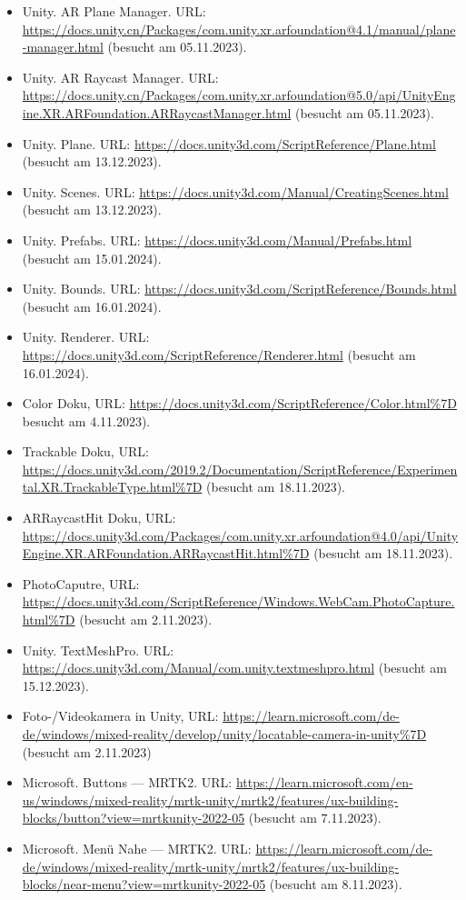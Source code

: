 \begin{itemize}
    \item Unity. AR Plane Manager. URL: \url{https://docs.unity.cn/Packages/com.unity.xr.arfoundation@4.1/manual/plane-manager.html} (besucht am 05.11.2023).
    \item Unity. AR Raycast Manager. URL: \url{https://docs.unity.cn/Packages/com.unity.xr.arfoundation@5.0/api/UnityEngine.XR.ARFoundation.ARRaycastManager.html} (besucht am 05.11.2023).
    \item Unity. Plane. URL: \url{https://docs.unity3d.com/ScriptReference/Plane.html} (besucht am 13.12.2023).
    \item Unity. Scenes. URL: \url{https://docs.unity3d.com/Manual/CreatingScenes.html} (besucht am 13.12.2023).
    \item Unity. Prefabs. URL: \url{https://docs.unity3d.com/Manual/Prefabs.html} (besucht am 15.01.2024).
    \item Unity. Bounds. URL: \url{https://docs.unity3d.com/ScriptReference/Bounds.html} (besucht am 16.01.2024).
    \item Unity. Renderer. URL: \url{https://docs.unity3d.com/ScriptReference/Renderer.html} (besucht am 16.01.2024).
    \item Color Doku, URL:  \url{https://docs.unity3d.com/ScriptReference/Color.html%7D} besucht am 4.11.2023).
    \item Trackable Doku, URL:  \url{https://docs.unity3d.com/2019.2/Documentation/ScriptReference/Experimental.XR.TrackableType.html%7D} (besucht am 18.11.2023).
    \item ARRaycastHit Doku, URL:  \url{https://docs.unity3d.com/Packages/com.unity.xr.arfoundation@4.0/api/UnityEngine.XR.ARFoundation.ARRaycastHit.html%7D} (besucht am 18.11.2023).
    \item PhotoCaputre, URL:  \url{https://docs.unity3d.com/ScriptReference/Windows.WebCam.PhotoCapture.html%7D} (besucht am 2.11.2023).
    \item Unity. TextMeshPro. URL: \url{https://docs.unity3d.com/Manual/com.unity.textmeshpro.html} (besucht am 15.12.2023).
    \item Foto-/Videokamera in Unity, URL:  \url{https://learn.microsoft.com/de-de/windows/mixed-reality/develop/unity/locatable-camera-in-unity%7D} (besucht am 2.11.2023)
    \item Microsoft. Buttons — MRTK2. URL: \url{https://learn.microsoft.com/en-us/windows/mixed-reality/mrtk-unity/mrtk2/features/ux-building-blocks/button?view=mrtkunity-2022-05} (besucht am 7.11.2023).
    \item Microsoft. Menü Nahe — MRTK2. URL: \url{https://learn.microsoft.com/de-de/windows/mixed-reality/mrtk-unity/mrtk2/features/ux-building-blocks/near-menu?view=mrtkunity-2022-05} (besucht am 8.11.2023).

\end{itemize}

